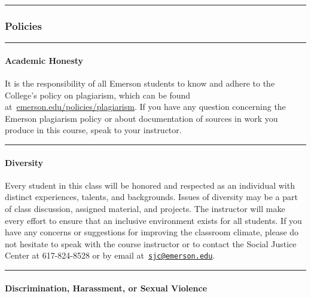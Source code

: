 \documentclass[
  letterpaper,
  DIV=11,
  numbers=noendperiod]{scrartcl}
\let\oldparagraph\paragraph
\renewcommand{\paragraph}[1]{\oldparagraph{#1}\mbox{}}
\begin{document}
\begin{center}\rule{0.5\linewidth}{0.5pt}\end{center}

\hypertarget{policies}{%
\subsubsection{Policies}\label{policies}}

\begin{center}\rule{0.5\linewidth}{0.5pt}\end{center}

\hypertarget{academic-honesty}{%
\paragraph{Academic Honesty}\label{academic-honesty}}

It is the responsibility of all Emerson students to know and adhere to
the College's policy on plagiarism, which can be found
at~\href{https://emerson.edu/policies/plagiarism}{emerson.edu/policies/plagiarism}.
If you have any question concerning the Emerson plagiarism policy or
about documentation of sources in work you produce in this course, speak
to your instructor.

\begin{center}\rule{0.5\linewidth}{0.5pt}\end{center}

\hypertarget{diversity}{%
\paragraph{Diversity}\label{diversity}}

Every student in this class will be honored and respected as an
individual with distinct experiences, talents, and backgrounds. Issues
of diversity may be a part of class discussion, assigned material, and
projects. The instructor will make every effort to ensure that an
inclusive environment exists for all students. If you have any concerns
or suggestions for improving the classroom climate, please do not
hesitate to speak with the course instructor or to contact the Social
Justice Center at 617-824-8528 or by email
at~\href{mailto:sjc@emerson.edu}{\nolinkurl{sjc@emerson.edu}}.

\begin{center}\rule{0.5\linewidth}{0.5pt}\end{center}

\hypertarget{discrimination-harassment-or-sexual-violence}{%
\paragraph{Discrimination, Harassment, or Sexual
Violence}\label{discrimination-harassment-or-sexual-violence}}
\end{document}
